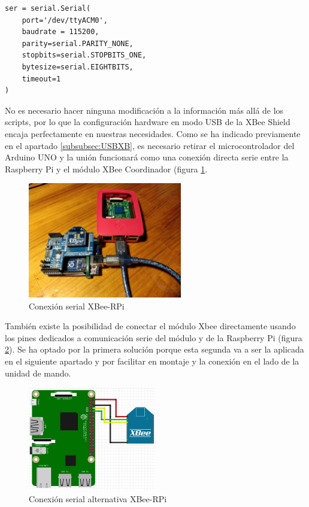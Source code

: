 
\begin{lstlisting}[frame=leftline, caption={Configuración serial}, label=code:SerialConf]
ser = serial.Serial(
	port='/dev/ttyACM0',
	baudrate = 115200,
	parity=serial.PARITY_NONE,
	stopbits=serial.STOPBITS_ONE,
	bytesize=serial.EIGHTBITS,
	timeout=1
)
\end{lstlisting}

No es necesario hacer ninguna modificación a la información más allá de los scripts, por lo que la configuración hardware en modo USB de la XBee Shield encaja perfectamente en nuestras necesidades. Como se ha indicado previamente en el apartado \ref{subsubsec:USBXB}, es necesario retirar el microcontrolador del Arduino UNO y la unión funcionará como una conexión directa serie entre la Raspberry Pi y el módulo XBee Coordinador (figura \ref{fig:RPiXB}.

\begin{figure}[hbt]
\centering
\includegraphics[width=0.6\textwidth]{figuras/RPiXB.png}
\caption{Conexión serial XBee-RPi}
\label{fig:RPiXB}
\end{figure}

También existe la posibilidad de conectar el módulo Xbee directamente usando los pines dedicados a comunicación serie del módulo y de la Raspberry Pi (figura \ref{fig:RPiXBserial}). Se ha optado por la primera solución porque esta segunda va a ser la aplicada en el siguiente apartado y por facilitar en montaje y la conexión en el lado de la unidad de mando. 

\begin{figure}[hbt]
\centering
\includegraphics[width=0.5\textwidth]{figuras/RPiXBserial.png}
\caption{Conexión serial alternativa XBee-RPi}
\label{fig:RPiXBserial}
\end{figure}


